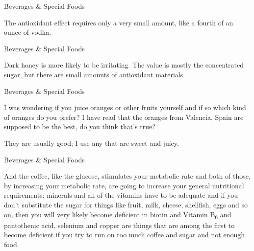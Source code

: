 \documentclass[11pt,oneside,openany,extrafontsizes]{memoir}
\begin{document}
\begin{standalonequote}{Beverages \& Special Foods}

    \begin{answer}
       The antioxidant effect requires only a very small amount, like a fourth of an ounce of vodka. 
    \end{answer}
\end{standalonequote}

\begin{standalonequote}{Beverages \& Special Foods}

    \begin{answer}
      Dark honey is more likely to be irritating. The value is mostly the concentrated sugar, but there are small amounts of antioxidant materials.
    \end{answer}
\end{standalonequote}

\begin{qaexchange}{Beverages \& Special Foods}

    \begin{question}
        I was wondering if you juice oranges or other fruits yourself and if so which kind of oranges do you prefer? I have read that the oranges from Valencia, Spain are supposed to be the best, do you think that's true? 
    \end{question}

    \begin{answer}
      They are usually good; I use any that are sweet and juicy.
    \end{answer}
\end{qaexchange}

\begin{standalonequote}{Beverages \& Special Foods}

    \begin{answer}
      And the coffee, like the glucose, stimulates your metabolic rate and both of those, by increasing your metabolic rate, are going to increase your general nutritional requirements: minerals and all of the vitamins have to be adequate and if you don't substitute the sugar for things like fruit, milk, cheese, shellfish, eggs and so on, then you will very likely become deficient in biotin and Vitamin B\textsubscript{6} and pantothenic acid, selenium and copper are things that are among the first to become deficient if you try to run on too much coffee and sugar and not enough food.
    \end{answer}
\end{standalonequote}
\end{document}

